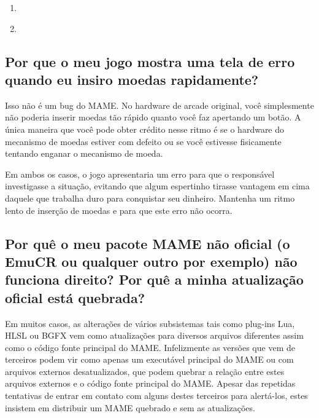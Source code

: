 \documentclass[letterpaper,10pt,brazil]{sphinxmanual}
\begin{document}
\begin{enumerate}
\item {} 
{\hyperref[usingmame/commonissues:controllerissues]{}}

\item {} 
{\hyperref[usingmame/commonissues:externalopl]{}}

\end{enumerate}


\subsection{Por que o meu jogo mostra uma tela de erro quando eu insiro moedas rapidamente?}
\label{usingmame/commonissues:rapid-coins}\label{usingmame/commonissues:por-que-o-meu-jogo-mostra-uma-tela-de-erro-quando-eu-insiro-moedas-rapidamente}
Isso não é um bug do MAME.
No hardware de arcade original, você simplesmente não poderia inserir
moedas tão rápido quanto você faz apertando um botão. A única maneira
que você pode obter crédito nesse ritmo é se o hardware do mecanismo de
moedas estiver com defeito ou se você estivesse fisicamente tentando
enganar o mecanismo de moeda.

Em ambos os casos, o jogo apresentaria um erro para que o responsável
investigasse a situação, evitando que algum espertinho tirasse vantagem
em cima daquele que trabalha duro para conquistar seu dinheiro.
Mantenha um ritmo lento de inserção de moedas e para que este erro não
ocorra.


\subsection{Por quê o meu pacote MAME não oficial (o EmuCR ou qualquer outro por exemplo) não funciona direito? Por quê a minha atualização oficial está quebrada?}
\label{usingmame/commonissues:broken-package}\label{usingmame/commonissues:por-que-o-meu-pacote-mame-nao-oficial-o-emucr-ou-qualquer-outro-por-exemplo-nao-funciona-direito-por-que-a-minha-atualizacao-oficial-esta-quebrada}
Em muitos casos, as alterações de vários subsistemas tais como plug-ins
Lua, HLSL ou BGFX vem como atualizações para diversos arquivos
diferentes assim como o código fonte principal do MAME.
Infelizmente as versões que vem de terceiros podem vir como apenas um
executável principal do MAME ou com arquivos externos desatualizados,
que podem quebrar a relação entre estes arquivos externos e o código
fonte principal do MAME. Apesar das repetidas tentativas de entrar em
contato com alguns destes terceiros para alertá-los, estes insistem em
distribuir um MAME quebrado e sem as atualizações.
\end{document}

